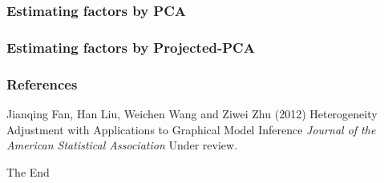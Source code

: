 \documentclass{beamer}
\begin{document}

\begin{frame}
\frametitle{Estimating factors by PCA}

\end{frame}



\begin{frame}
\frametitle{Estimating factors by Projected-PCA}

\end{frame}


\begin{frame}
\frametitle{References}
\footnotesize{
\begin{thebibliography}{99} %
 Jianqing Fan, Han Liu, Weichen Wang and Ziwei Zhu (2012)
\newblock Heterogeneity Adjustment with Applications to Graphical Model Inference
\newblock \emph{Journal of the American Statistical Association} Under review.
\end{thebibliography}
}
\end{frame}


\begin{frame}
\Huge{\centerline{The End}}
\end{frame}

\end{document}
